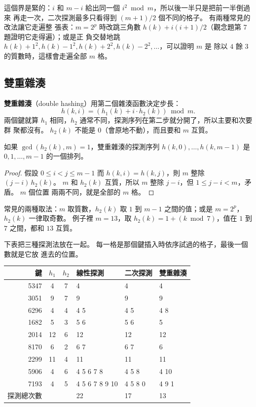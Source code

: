 這個界是緊的：$i$ 和 $m - i$ 給出同一個 $i^2 \bmod m$，所以後一半只是把前一半倒過來
再走一次，二次探測最多只看得到 $(m+1)/2$ 個不同的格子。 有兩種常見的改法讓它走遍整
張表：$m = 2^p$ 時改跳三角數 $h(k) + i(i+1)/2$（觀念題第 7 題證明它走得遍）；或是正
負交替地跳 $h(k) + 1^2, h(k) - 1^2, h(k) + 2^2, h(k) - 2^2, \ldots$，可以證明 $m$ 是
除以 $4$ 餘 $3$ 的質數時，這樣會走遍全部 $m$ 格。

\subsection{雙重雜湊}

\textbf{雙重雜湊}（double hashing）用第二個雜湊函數決定步長：
\[
h(k, i) = (h_1(k) + i \cdot h_2(k)) \bmod m.
\]
兩個鍵就算 $h_1$ 相同，$h_2$ 通常不同，探測序列在第二步就分開了，所以主要和次要群
聚都沒有。 $h_2(k)$ 不能是 $0$（會原地不動），而且要和 $m$ 互質。

\begin{theorem}
\label{thm:hash-double}
如果 $\gcd(h_2(k), m) = 1$，雙重雜湊的探測序列 $h(k, 0), \ldots, h(k, m-1)$ 是
$0, 1, \ldots, m-1$ 的一個排列。
\end{theorem}

\begin{proof}
假設 $0 \le i < j \le m - 1$ 而 $h(k, i) = h(k, j)$，則 $m$ 整除 $(j - i)\,h_2(k)$。
$m$ 和 $h_2(k)$ 互質，所以 $m$ 整除 $j - i$，但 $1 \le j - i < m$，矛盾。 $m$ 個位置
兩兩不同，就是全部的 $m$ 格。
\end{proof}

常見的兩種取法：$m$ 取質數，$h_2(k)$ 取 $1$ 到 $m - 1$ 之間的值；或是 $m = 2^p$，
$h_2(k)$ 一律取奇數。 例子裡 $m = 13$，取 $h_2(k) = 1 + (k \bmod 7)$，值在 $1$ 到
$7$ 之間，都和 $13$ 互質。

下表把三種探測法放在一起。 每一格是那個鍵插入時依序試過的格子，最後一個數就是它放
進去的位置。

\begin{center}
\begin{tabular}{rcclll}
\toprule
鍵 & $h_1$ & $h_2$ & 線性探測 & 二次探測 & 雙重雜湊 \\
\midrule
5347 & 4 & 7 & 4 & 4 & 4 \\
3051 & 9 & 7 & 9 & 9 & 9 \\
6296 & 4 & 4 & 4 5 & 4 5 & 4 8 \\
1682 & 5 & 3 & 5 6 & 5 6 & 5 \\
2014 & 12 & 6 & 12 & 12 & 12 \\
8170 & 6 & 2 & 6 7 & 6 7 & 6 \\
2299 & 11 & 4 & 11 & 11 & 11 \\
5906 & 4 & 6 & 4 5 6 7 8 & 4 5 8 & 4 10 \\
7193 & 4 & 5 & 4 5 6 7 8 9 10 & 4 5 8 0 & 4 9 1 \\
\midrule
探測總次數 & & & 22 & 17 & 13 \\
\bottomrule
\end{tabular}
\end{center}

